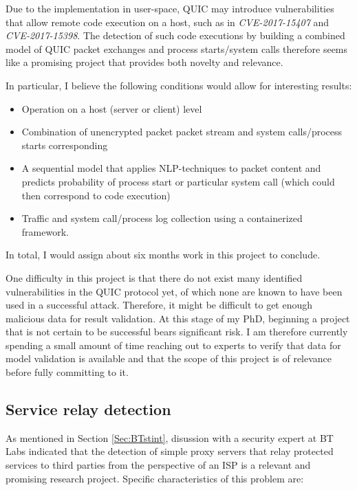 \documentclass[a4paper,12pt,twoside]{article}
\begin{document}
Due to the implementation in user-space, QUIC may introduce vulnerabilities that allow remote code execution on a host, such as in \textit{CVE-2017-15407} and \textit{CVE-2017-15398}. The detection of such code executions by building a combined model of QUIC packet exchanges and process starts/system calls therefore seems like a promising project that provides both novelty and relevance.

In particular, I believe the following conditions would allow for interesting results:
\begin{itemize}
\item Operation on a host (server or client) level
\item Combination of unencrypted packet packet stream and system calls/process starts corresponding
\item A sequential model that applies NLP-techniques to packet content and predicts probability of process start or particular system call (which could then correspond to code execution)
\item Traffic and system call/process log collection using a containerized framework.
\end{itemize}

In total, I would assign about six months work in this project to conclude.


One difficulty in this project is that there do not exist many identified vulnerabilities in the QUIC protocol yet, of which none are known to have been used in a successful attack. Therefore, it might be difficult to get enough malicious data for result validation. At this stage of my PhD, beginning a project that is not certain to be successful bears significant risk.  I am therefore currently spending a small amount of time reaching out to experts to verify that data for model validation is available and that the scope of this project is of relevance before fully committing to it.



\subsection{Service relay detection}\label{Sec:Relay}

As mentioned in Section \ref{Sec:BTstint}, disussion with a security expert at BT Labs indicated that the detection of simple proxy servers that relay protected services to third parties from the perspective of an ISP is a relevant and promising research project. Specific characteristics of this problem are:
\end{document}
